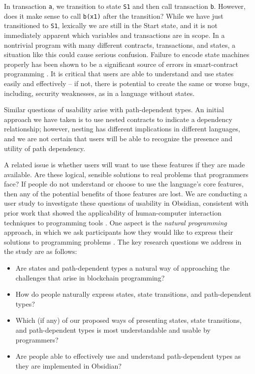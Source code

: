 \documentclass[sigplan,10pt,review]{acmart}\settopmatter{printfolios=true}
\begin{document}
In transaction \texttt{\small{a}}, we transition to state \texttt{\small{S1}} and then call transaction \texttt{\small{b}}. 
However, does it make sense to call \texttt{\small{b(x1)}} after the transition? While we have just 
transitioned to \texttt{\small{S1}}, lexically we are still in the 
Start state, and it is not immediately apparent which variables and transactions are in scope. 
In a nontrivial program with many different contracts, 
transactions, and states, a situation like this could cause serious confusion. Failure to encode state 
machines properly has been shown to be a significant source of errors in smart-contract 
programming \cite{Delmolino}. It is critical that users are able to understand and use states easily and 
effectively -- if not, there is potential to create the same or worse bugs, including, security weaknesses, as in a 
language without states. 

Similar questions of usability arise with path-dependent types. An initial approach we have taken is 
to use nested contracts to indicate a dependency relationship; however, nesting has different 
implications in different languages, and we are not certain that users will be able to recognize the 
presence and utility of path dependency. 

	A related issue is whether users will want to use these features if they are made available. Are 
these logical, sensible solutions to real problems that programmers face? If people do not 
understand or choose to use the language's core features, then any of the potential benefits 
of those features are lost. 
	We are conducting a user study to investigate these questions of usability in Obsidian, consistent with prior work that showed the applicability of human-computer interaction techniques to programming tools \cite{Myers}. One aspect is the \textit{natural programming} approach, in which we ask participants how they would like to express their solutions to programming problems \cite{Natural}. The key research questions we address in the study are as follows: 
\begin{itemize}
\item Are states and path-dependent types a natural way of 
	approaching the challenges that arise in blockchain programming?
\item How do people naturally express states, state transitions, and path-dependent types?
\item Which (if any) of our proposed ways of presenting states, state transitions, and path-dependent types
	is most understandable and usable by programmers?
\item Are people able to effectively use and understand path-dependent types as they
are implemented in Obsidian?
\end{itemize}
\end{document}
